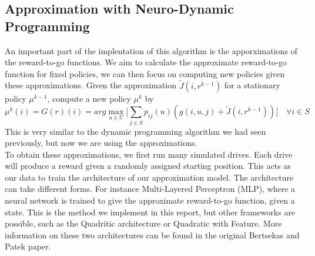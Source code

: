 \documentclass[11pt, oneside]{article}   	%
\begin{document}
\subsection{Approximation with Neuro-Dynamic Programming}
An important part of the implentation of this algorithm is the apporximations of the reward-to-go functions. We aim to calculate the approximate reward-to-go function for fixed policies, we can then focus on computing new policies given these approximations. Given the approximation $\widetilde{J}(i,r^{k-1})$ for a stationary policy $\mu^{k-1}$, compute a new policy $\mu^{k}$ by
$$
\mu^{k}(i) = G(r)(i) = arg\max\limits_{u \in U} \Big[ \sum\limits_{j \in S} p_{ij}(u)(g(i,u,j) +  \widetilde{J}(i,r^{k-1}))\Big] \quad \forall i \in S
$$
This is very similar to the dynamic programming algorithm we had seen previously, but now we are using the approximations. \\

To obtain these approximations, we first run many simulated drives. Each drive will produce a reward given a randomly assigned starting position. This acts as our data to train the architecture of our approximation model. The architecture can take different forms. For instance Multi-Layered Perceptron (MLP), where a neural network is trained to give the approximate reward-to-go function, given a state. This is the method we implement in this report, but other frameworks are possible, such as the Quadritic architecture or Quadratic with Feature. More information on these two architectures can be found in the original Bertsekas and Patek paper.

\end{document}
